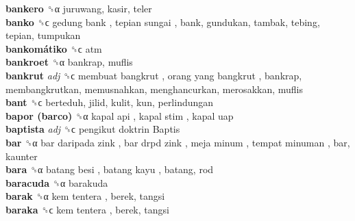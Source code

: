 \textbf{bankero} ␝α  juruwang, kasir, teler  \\
\textbf{banko} ␝ϲ   gedung bank ,  tepian sungai , bank, gundukan, tambak, tebing, tepian, tumpukan  \\
\textbf{bankomátiko} ␝ϲ  atm  \\
\textbf{bankroet} ␝α  bankrap, muflis  \\
\textbf{bankrut} \emph{adj}  ␝ϲ   membuat bangkrut ,  orang yang bangkrut , bankrap, membangkrutkan, memusnahkan, menghancurkan, merosakkan, muflis  \\
\textbf{bant} ␝ϲ  berteduh, jilid, kulit, kun, perlindungan  \\
\textbf{bapor (barco)} ␝α   kapal api ,  kapal stim ,  kapal uap   \\
\textbf{baptista} \emph{adj}  ␝ϲ   pengikut doktrin Baptis   \\
\textbf{bar} ␝α   bar daripada zink ,  bar drpd zink ,  meja minum ,  tempat minuman , bar, kaunter  \\
\textbf{bara} ␝α   batang besi ,  batang kayu , batang, rod  \\
\textbf{baracuda} ␝α  barakuda  \\
\textbf{barak} ␝α   kem tentera , berek, tangsi  \\
\textbf{baraka} ␝ϲ   kem tentera , berek, tangsi  \\

